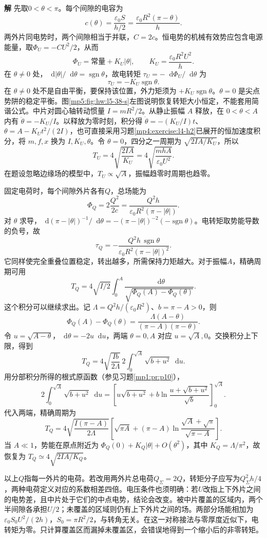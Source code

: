 \documentclass[11pt,openany,fontset=fandol]{ctexbook}
\theoremstyle{definition}\newtheorem{example}{例}[chapter]\newtheorem{exercise}{习题}[chapter]
\newcommand{\SolutionStart}{\par\medskip\ifdim\pagetotal>0pt\ifdim\dimexpr\pagegoal-\pagetotal\relax<3\baselineskip\newpage\fi\fi\noindent\textbf{解}\quad\ignorespaces}
\newenvironment{solution}{\SolutionStart}{\par\medskip}
\newcommand{\dd}{\mathop{}\!\mathrm d}\newcommand{\ee}{\mathrm e}\newcommand{\vct}[1]{\bm{#1}}
\begin{document}
\begin{solution}
先取$0<\theta<\pi$。每个间隙的电容为
\[
 c(\theta)=\frac{\varepsilon_0S}{h/2}
          =\frac{\varepsilon_0R^2(\pi-\theta)}h.
\]
两外片同电势时，两个间隙相当于并联，$C=2c$。恒电势的机械有效势应包含电源能量，取$\Phi_U=-CU^2/2$，从而
\[
 \Phi_U=\text{常量}+K_U|\theta|,
 \qquad K_U=\frac{\varepsilon_0R^2U^2}{h}.
\]
在 $\theta\ne0$ 处，$\dd|\theta|/\dd\theta=\operatorname{sgn}\theta$，故电转矩 $\tau_U=-\dd\Phi_U/\dd\theta$ 为
\[
 \boxed{\tau_U=-K_U\operatorname{sgn}\theta}.
\]
在 $\theta\ne0$ 处不是自由平衡，要保持该位置，外力矩须为 $+K_U\operatorname{sgn}\theta$。$\theta=0$ 是尖点势阱的稳定平衡。图\ref{mp5:fig:hw:l5-38-s}左图说明恢复转矩大小恒定，不能套用简谐公式。中片对圆心轴转动惯量 $I=mR^2/2$。从静止振幅 $A$ 释放，在 $0<\theta<A$ 内有 $\ddot\theta=-K_U/I$。以释放为零时刻，积分得 $\dot\theta=-(K_U/I)t$、$\theta=A-K_Ut^2/(2I)$，也可直接采用习题\ref{mp4:exercise:l4-h2}已展开的恒加速度积分，将 $m,f,x$ 换为 $I,K_U,\theta$。令 $\theta=0$，四分之一周期为 $\sqrt{2IA/K_U}$，所以
\[
 \boxed{T_U=4\sqrt{\frac{2IA}{K_U}}
            =4\sqrt{\frac{mhA}{\varepsilon_0U^2}}}.
\]
在题设忽略边缘场的模型中，$T_U\propto\sqrt A$，振幅趋零时周期也趋零。

固定电荷时，每个间隙外片各有$Q$，总场能为
\[
 \Phi_Q=2\frac{Q^2}{2c}
       =\frac{Q^2h}{\varepsilon_0R^2(\pi-|\theta|)}.
\]
对 $\theta$ 求导，$\dd(\pi-|\theta|)^{-1}/\dd\theta=-(\pi-|\theta|)^{-2}(-\operatorname{sgn}\theta)$。电转矩取势能导数的负号，故
\[
 \boxed{\tau_Q=-\frac{Q^2h\,\operatorname{sgn}\theta}
 {\varepsilon_0R^2(\pi-|\theta|)^2}}.
\]
它同样使完全重叠位置稳定，转出越多，所需保持力矩越大。对于振幅$A$，精确周期可用
\[
 T_Q=4\sqrt{I/2}\int_0^A
 \frac{\dd\theta}{\sqrt{\Phi_Q(A)-\Phi_Q(\theta)}}.
\]
这个积分可以继续求出。记 $\Lambda=Q^2h/(\varepsilon_0R^2)$、$b=\pi-A>0$，则
\[
\Phi_Q(A)-\Phi_Q(\theta)
=\frac{\Lambda(A-\theta)}{(\pi-A)(\pi-\theta)}.
\]
令 $u=\sqrt{A-\theta}$，$\dd\theta=-2u\dd u$，两端 $\theta=0,A$ 对应 $u=\sqrt A,0$。交换积分上下限，得到
\[
T_Q=4\sqrt{\frac{Ib}{2\Lambda}}\,2\int_0^{\sqrt A}\sqrt{b+u^2}\dd u.
\]
用分部积分所得的根式原函数（参见习题\ref{mp1:pr:p10}），
\[
2\int_0^{\sqrt A}\sqrt{b+u^2}\dd u
=\left[u\sqrt{b+u^2}+b\ln\frac{u+\sqrt{b+u^2}}{\sqrt b}\right]_0^{\sqrt A}.
\]
代入两端，精确周期为
\[
\boxed{T_Q=4\sqrt{\frac{I(\pi-A)}{2\Lambda}}\left[
\sqrt{\pi A}+(\pi-A)\ln\frac{\sqrt A+\sqrt\pi}{\sqrt{\pi-A}}\right].}
\]
当 $A\ll1$，势能在原点附近为 $\Phi_Q(0)+K_Q|\theta|+O(\theta^2)$，其中 $K_Q=\Lambda/\pi^2$，故恢复为 $T_Q\simeq4\sqrt{2IA/K_Q}$。

以上$Q$指每一外片的电荷。若改用两外片总电荷$Q_\Sigma=2Q$，转矩分子应写为$Q_\Sigma^2h/4$，两种电荷定义对应的系数相差四倍。电压条件也须明确：若$U$改指上下外片之间的电势差，且中片处于它们的中点电势，结论会改变。被中片覆盖的区域内，两个半间隙各承担$U/2$；未覆盖的区域则仍有上下外片之间的场。两部分场能相加为$\varepsilon_0S_0U^2/(2h)$，$S_0=\pi R^2/2$，与转角无关。在这一对称接法与零厚度近似下，电转矩为零。只计算覆盖区而漏掉未覆盖区，会错误地得到一个缩小后的非零转矩。



\end{solution}
\end{document}
